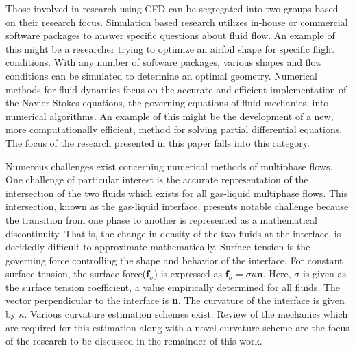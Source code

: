 Those involved in research using CFD can be segregated into two groups based on their research focus. Simulation based research utilizes in-house or commercial software packages to answer specific questions about fluid flow. An example of this might be a researcher trying to optimize an airfoil shape for specific flight conditions. With any number of software packages, various shapes and flow conditions can be simulated to determine an optimal geometry. Numerical methods for fluid dynamics focus on the accurate and efficient implementation of the Navier-Stokes equations, the governing equations of fluid mechanics, into numerical algorithms. An example of this might be the development of a new, more computationally efficient, method for solving partial differential equations. The focus of the research presented in this paper falls into this category. 

Numerous challenges exist concerning numerical methods of multiphase flows. One challenge of particular interest is the accurate representation of the intersection of the two fluids which exists for all gas-liquid multiphase flows. This intersection, known as the gas-liquid interface, presents notable challenge because the transition from one phase to another is represented as a mathematical discontinuity. That is, the change in density of the two fluids at the interface, is decidedly difficult to approximate mathematically. Surface tension is the governing force controlling the shape and behavior of the interface. For constant surface tension, the surface force($\textbf{f}_{\sigma}$) is expressed as $\textbf{f}_{\sigma} = \sigma \kappa \textbf{n}$\cite{Desjardins2013}. Here, $\sigma$ is given as the surface tension coefficient, a value empirically determined for all fluids. The vector perpendicular to the interface is \textbf{n}. The curvature of the interface is given by $\kappa$. Various curvature estimation schemes exist. Review of the mechanics which are required for this estimation along with a novel curvature scheme are the focus of the research to be discussed in the remainder of this work.    

 



